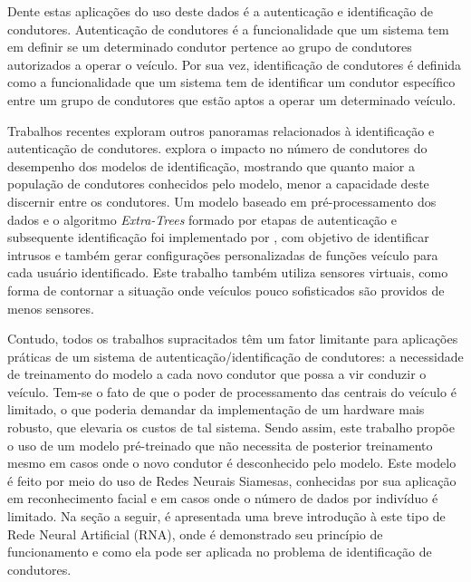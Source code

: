 \documentclass[conference,harvard,brazil,english]{sbatex}
\begin{document}
Dente estas aplicações do uso deste dados é a autenticação e identificação de condutores. Autenticação de condutores é a funcionalidade que um sistema tem em definir se um determinado condutor pertence ao grupo de condutores autorizados a operar o veículo. Por sua vez, identificação de condutores é definida como a funcionalidade que um sistema tem de identificar um condutor específico entre um grupo de condutores que estão aptos a operar um determinado veículo. 

Trabalhos recentes exploram outros panoramas relacionados à identificação e autenticação de condutores.  explora o impacto no número de condutores do desempenho dos modelos de identificação, mostrando que quanto maior a população de condutores conhecidos pelo modelo, menor a capacidade deste discernir entre os condutores. Um modelo baseado em pré-processamento dos dados e o algoritmo \textit{Extra-Trees} formado por etapas de autenticação e subsequente identificação foi implementado por \cite{sbrc}, com objetivo de identificar intrusos e também gerar configurações personalizadas de funções veículo para cada usuário identificado. Este trabalho também utiliza sensores virtuais, como forma de contornar a situação onde veículos pouco sofisticados são providos de menos sensores.


Contudo, todos os trabalhos supracitados têm um fator limitante para aplicações práticas de um sistema de autenticação/identificação de condutores: a necessidade de treinamento do modelo a cada novo condutor que possa a vir conduzir o veículo. Tem-se o fato de que o poder de processamento das centrais do veículo é limitado, o que poderia demandar da implementação de um hardware mais robusto, que elevaria os custos de tal sistema. Sendo assim, este trabalho propõe o uso de um modelo pré-treinado que não necessita de posterior treinamento mesmo em casos onde o novo condutor é desconhecido pelo modelo. Este modelo é feito por meio do uso de Redes Neurais Siamesas, conhecidas por sua aplicação em reconhecimento facial e em casos onde o número de dados por indivíduo é limitado. Na seção a seguir, é apresentada uma breve introdução à este tipo de Rede Neural Artificial (RNA), onde é demonstrado seu princípio de funcionamento e como ela pode ser aplicada no problema de identificação de condutores.
\end{document}
